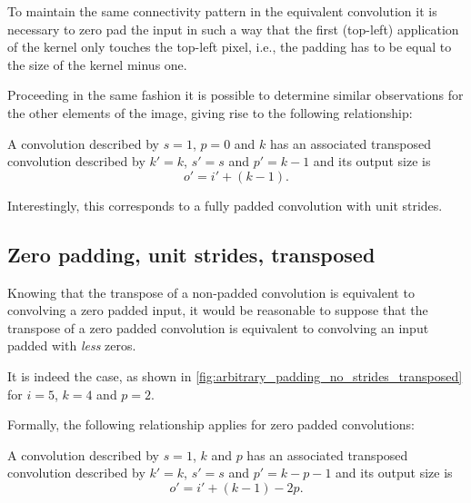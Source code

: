 To maintain the same connectivity pattern in the equivalent convolution it is
necessary to zero pad the input in such a way that the first (top-left)
application of the kernel only touches the top-left pixel, i.e., the padding
has to be equal to the size of the kernel minus one.

Proceeding in the same fashion it is possible to determine similar observations
for the other elements of the image, giving rise to the following relationship:

\begin{relationship}\label{rel:no_padding_no_strides_transposed}
A convolution described by $s = 1$, $p = 0$ and $k$ has an associated
transposed convolution described by $k' = k$, $s' = s$ and $p' = k - 1$ and its
output size is
\begin{equation*}
    o' = i' + (k - 1).
\end{equation*}
\end{relationship}

Interestingly, this corresponds to a fully padded convolution with unit
strides.

\subsection{Zero padding, unit strides, transposed}

Knowing that the transpose of a non-padded convolution is equivalent to
convolving a zero padded input, it would be reasonable to suppose that the
transpose of a zero padded convolution is equivalent to convolving an input
padded with {\em less\/} zeros.

It is indeed the case, as shown in
\autoref{fig:arbitrary_padding_no_strides_transposed} for $i = 5$, $k = 4$ and
$p = 2$.

Formally, the following relationship applies for zero padded convolutions:

\begin{relationship}\label{rel:arbitrary_padding_no_strides_transposed}
A convolution described by $s = 1$, $k$ and $p$ has an
associated transposed convolution described by $k' = k$, $s' = s$ and $p' = k -
p - 1$ and its output size is
\begin{equation*}
    o' = i' + (k - 1) - 2p.
\end{equation*}
\end{relationship}

